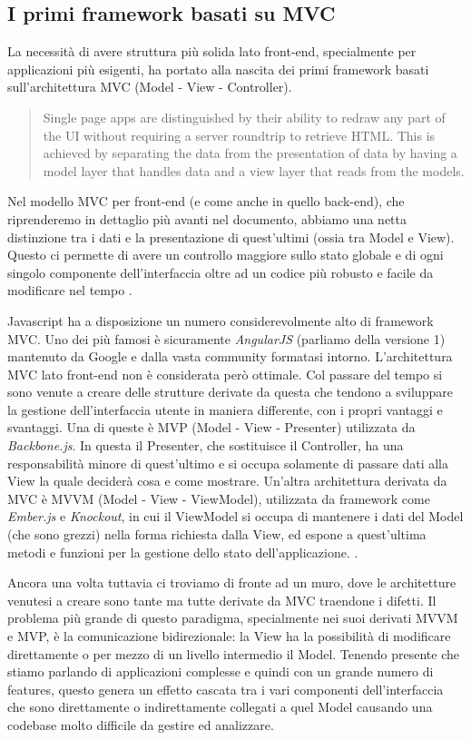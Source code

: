 \subsection{I primi framework basati su MVC}
La necessità di avere struttura più solida lato front-end, specialmente per applicazioni più esigenti, ha portato alla nascita dei primi framework basati sull'architettura MVC (Model - View - Controller).

\blockquote{Single page apps are distinguished by their ability to redraw any part of the UI without requiring a server roundtrip to retrieve HTML. This is achieved by separating the data from the presentation of data by having a model layer that handles data and a view layer that reads from the models. \cite{MixuSinglePageWebApp}}

\noindent Nel modello MVC per front-end (e come anche in quello back-end), che riprenderemo in dettaglio più avanti nel documento, abbiamo una netta distinzione tra i dati e la presentazione di quest'ultimi (ossia tra Model e View). Questo ci permette di avere un controllo maggiore sullo stato globale e di ogni singolo componente dell'interfaccia oltre ad un codice più robusto e facile da modificare nel tempo \cite{ParrOnTheMVC}.

Javascript ha a disposizione un numero considerevolmente alto di framework MVC. Uno dei più famosi è sicuramente \textit{AngularJS} (parliamo della versione 1) mantenuto da Google e dalla vasta community formatasi intorno.
L'architettura MVC lato front-end non è considerata però ottimale. Col passare del tempo si sono venute a creare delle strutture derivate da questa che tendono a sviluppare la gestione dell'interfaccia utente in maniera differente, con i propri vantaggi e svantaggi. Una di queste è MVP (Model - View - Presenter) utilizzata da \textit{Backbone.js}. In questa il Presenter, che sostituisce il Controller, ha una responsabilità minore di quest'ultimo e si occupa solamente di passare dati alla View la quale deciderà cosa e come mostrare. Un'altra architettura derivata da MVC è MVVM (Model - View - ViewModel), utilizzata da framework come \textit{Ember.js} e \textit{Knockout}, in cui il ViewModel si occupa di mantenere i dati del Model (che sono grezzi) nella forma richiesta dalla View, ed espone a quest'ultima metodi e funzioni per la gestione dello stato dell'applicazione. \cite{ChauhanFrontendArchitectures}.

Ancora una volta tuttavia ci troviamo di fronte ad un muro, dove le architetture venutesi a creare sono tante ma tutte derivate da MVC traendone i difetti. Il problema più grande di questo paradigma, specialmente nei suoi derivati MVVM e MVP, è la comunicazione bidirezionale: la View ha la possibilità di modificare direttamente o per mezzo di un livello intermedio il Model. Tenendo presente che stiamo parlando di applicazioni complesse e quindi con un grande numero di features, questo genera un effetto cascata tra i vari componenti dell'interfaccia che sono direttamente o indirettamente collegati a quel Model causando una codebase molto difficile da gestire ed analizzare. 

